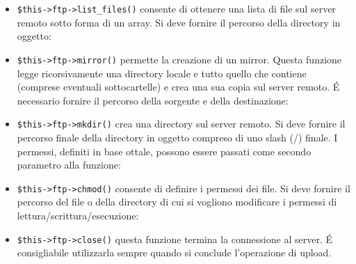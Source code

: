 \begin{itemize}
\verb|$this->ftp->delete_dir()| cancella una directory e ogni cosa al suo interno. \'E necessario fornire il percorso di origine della directory in oggetto con uno slash (/) finale:


Nota: \'E molto importante prestare la massima attenzione nell'utilizzare questa funzione. La sua natura ricorsiva consente di cancellare qualsiasi elemento all'interno del percorso specificato, comprese le sottocartelle e tutti i file. Assicurarsi che il percorso sia corretto utilizzando la funzione \verb|list_files()|.

\item \verb|$this->ftp->list_files()| consente di ottenere una lista di file sul server remoto sotto forma di un array. Si deve fornire il percorso della directory in oggetto:


\item \verb|$this->ftp->mirror()| permette la creazione di un mirror. Questa funzione legge ricorsivamente una directory locale e tutto quello che contiene (comprese eventuali sottocartelle) e crea una sua copia sul server remoto. \'E necessario fornire il percorso della sorgente e della destinazione:


\item \verb|$this->ftp->mkdir()| crea una directory sul server remoto. Si deve fornire il percorso finale della directory in oggetto compreso di uno slash (/) finale. I permessi, definiti in base ottale, possono essere passati come secondo parametro alla funzione:


\item \verb|$this->ftp->chmod()| consente di definire i permessi dei file. Si deve fornire il percorso del file o della directory di cui si vogliono modificare i permessi di lettura/scrittura/esecuzione:


\item \verb|$this->ftp->close()| questa funzione termina la connessione al server. \'E consigliabile utilizzarla sempre quando si conclude l'operazione di upload.
\end{itemize}